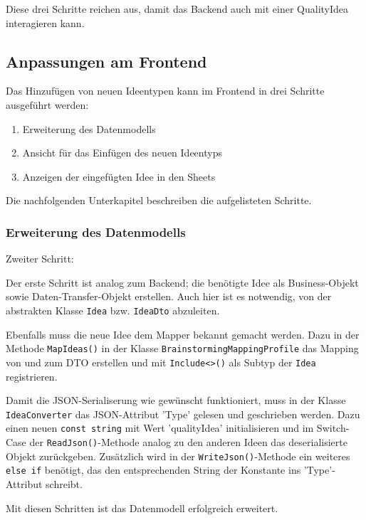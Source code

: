 Diese drei Schritte reichen aus, damit das Backend auch mit einer QualityIdea interagieren kann. 

\subsection{Anpassungen am Frontend}

Das Hinzufügen von neuen Ideentypen kann im Frontend in drei Schritte ausgeführt werden:
\begin{enumerate}
	\item Erweiterung des Datenmodells
	\item Ansicht für das Einfügen des neuen Ideentyps
	\item Anzeigen der eingefügten Idee in den Sheets
\end{enumerate}
Die nachfolgenden Unterkapitel beschreiben die aufgelisteten Schritte.

\subsubsection{Erweiterung des Datenmodells}

\begin{labeling}{Zweiter Schritt:}
	\item[Erster Schritt:] Der erste Schritt ist analog zum Backend; die benötigte Idee als Business-Objekt sowie Daten-Transfer-Objekt erstellen. Auch hier ist es notwendig, von der abstrakten Klasse \texttt{Idea} bzw. \texttt{IdeaDto} abzuleiten. 
	\item[Zweiter Schritt:] Ebenfalls muss die neue Idee dem Mapper bekannt gemacht werden. Dazu in der Methode \texttt{MapIdeas()} in der Klasse \texttt{Brainstorming\-Mapping\-Profile} das Mapping von und zum DTO erstellen und mit \texttt{Include<>()} als Subtyp der \texttt{Idea} registrieren. 
	\item[Dritter Schritt:] Damit die JSON-Serialiserung wie gewünscht funktioniert, muss in der Klasse \texttt{IdeaConverter} das JSON-Attribut 'Type' gelesen und geschrieben werden. Dazu einen neuen \texttt{const string} mit Wert 'qualityIdea' initialisieren und im Switch-Case der \texttt{ReadJson()}-Methode analog zu den anderen Ideen das deserialisierte Objekt zurückgeben. Zusätzlich wird in der \texttt{WriteJson()}-Methode ein weiteres \texttt{else if} benötigt, das den entsprechenden String der Konstante ins 'Type'-Attribut schreibt.
\end{labeling}

Mit diesen Schritten ist das Datenmodell erfolgreich erweitert.

